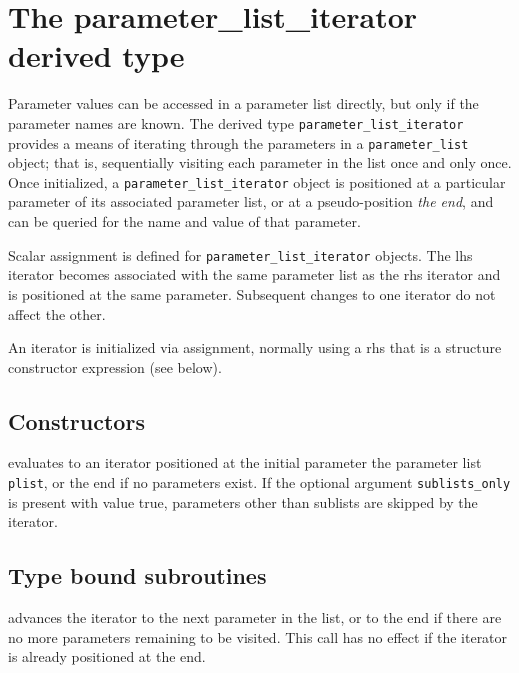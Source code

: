 \documentclass[11pt]{article}
\begin{document}
\section{The parameter_list_iterator derived type}
Parameter values can be accessed in a parameter list directly, but only if
the parameter names are known.  The derived type
\texttt{parameter_list_iterator} provides a means of iterating through
the parameters in a \texttt{parameter_list} object; that is, sequentially
visiting each parameter in the list once and only once.  Once initialized,
a \texttt{parameter_list_iterator} object is positioned at a particular
parameter of its associated parameter list, or at a pseudo-position
\emph{the end}, and can be queried for the name and value of that parameter. 

Scalar assignment is defined for \texttt{parameter_list_iterator} objects.
The lhs iterator becomes associated with the same parameter list as the rhs
iterator and is positioned at the same parameter.  Subsequent changes to one
iterator do not affect the other.

An iterator is initialized via assignment, normally using a rhs that is
a structure constructor expression (see below).

\subsection{Constructors}
\begin{description}[style=nextline]\setlength{\itemsep}{0pt}
\item[\texttt{parameter_list_iterator(plist \Lbr,sublists_only\Rbr)}]
  evaluates to an iterator positioned at the initial parameter the parameter
  list \texttt{plist}, or the end if no parameters exist.  If the optional
  argument \texttt{sublists_only} is present with value true, parameters other
  than sublists are skipped by the iterator.
\end{description}

\subsection{Type bound subroutines}
\begin{description}[style=nextline]\setlength{\itemsep}{0pt}
\item[\texttt{next()}]
  advances the iterator to the next parameter in the list, or to the end if
  there are no more parameters remaining to be visited.  This call has no
  effect if the iterator is already positioned at the end. 
\end{description}
\end{document}

